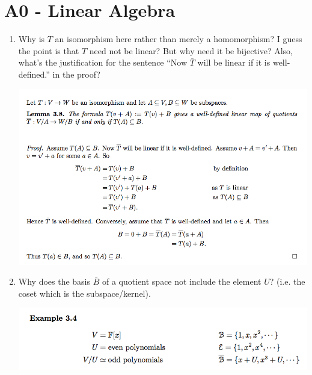 \documentclass[12pt]{article}
\begin{document}
\section{A0 - Linear Algebra}
\begin{enumerate}
\item Why is $T$ an isomorphism here rather than merely a homomorphism? I guess the point is that
  $T$ need not be linear? But why need it be bijective? Also, what's the justification for the
  sentence ``Now $\bar T$ will be linear if it is well-defined.'' in the proof?
  \begin{mdframed}
    \includegraphics[width=400pt]{img/questions-linear-algebra-a0-induced-map-well-defined-theorem.png}
  \end{mdframed}
\item Why does the basis $\bar B$ of a quotient space not include the element $U$? (i.e. the coset
  which is the subspace/kernel). 
  \begin{mdframed}
    \includegraphics[width=400pt]{img/questions-linear-algebra-a0-basis-of-quotient-space.png}
  \end{mdframed}
\end{enumerate}
\end{document}

